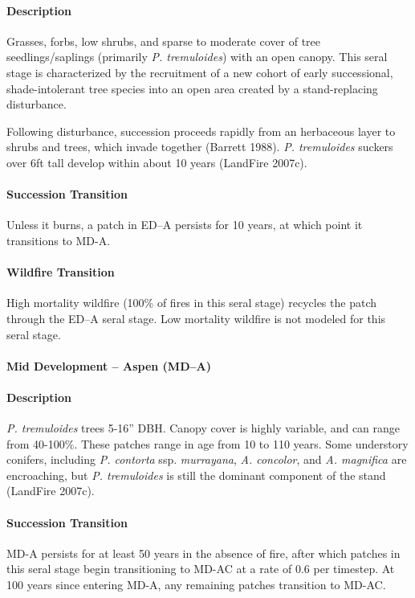 \paragraph{Description} Grasses, forbs, low shrubs, and sparse to moderate cover of tree seedlings/saplings (primarily \emph{P. tremuloides}) with an open canopy. This seral stage is characterized by the recruitment of a new cohort of early successional, shade-intolerant tree species into an open area created by a stand-replacing disturbance. 

Following disturbance, succession proceeds rapidly from an herbaceous layer to shrubs and trees, which invade together (Barrett 1988). \emph{P. tremuloides} suckers over 6ft tall develop within about 10 years (LandFire 2007c). 



\paragraph{Succession Transition} Unless it burns, a patch in ED–A persists for 10 years, at which point it transitions to MD-A.

\paragraph{Wildfire Transition} High mortality wildfire (100\% of fires in this seral stage) recycles the patch through the ED–A seral stage. Low mortality wildfire is not modeled for this seral stage.

\noindent\hrulefill


\paragraph{Mid Development – Aspen (MD–A)}

\paragraph{Description} \emph{P. tremuloides} trees 5-16'' DBH. Canopy cover is highly variable, and can range from 40-100\%. These patches range in age from 10 to 110 years. Some understory conifers, including \emph{P. contorta} ssp. \emph{murrayana}, \emph{A. concolor}, and \emph{A. magnifica} are encroaching, but \emph{P. tremuloides} is still the dominant component of the stand (LandFire 2007c).

\paragraph{Succession Transition} MD-A persists for at least 50 years in the absence of fire, after which patches in this seral stage begin transitioning to MD-AC at a rate of 0.6 per timestep. At 100 years since entering MD-A, any remaining patches transition to MD-AC.

